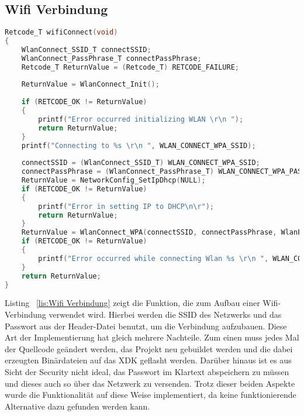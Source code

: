 \subsection{Wifi Verbindung}\label{subsec:Wifi Verbindung}
\begin{lstlisting}[language=C, caption={Wifi Verbindung}, label=lis:Wifi Verbindung]
Retcode_T wifiConnect(void)
{
	WlanConnect_SSID_T connectSSID;
	WlanConnect_PassPhrase_T connectPassPhrase;
	Retcode_T ReturnValue = (Retcode_T) RETCODE_FAILURE;
	
	ReturnValue = WlanConnect_Init();
	
	if (RETCODE_OK != ReturnValue)
	{
		printf("Error occurred initializing WLAN \r\n ");
		return ReturnValue;
	}
	printf("Connecting to %s \r\n ", WLAN_CONNECT_WPA_SSID);
	
	connectSSID = (WlanConnect_SSID_T) WLAN_CONNECT_WPA_SSID;
	connectPassPhrase = (WlanConnect_PassPhrase_T) WLAN_CONNECT_WPA_PASS;
	ReturnValue = NetworkConfig_SetIpDhcp(NULL);
	if (RETCODE_OK != ReturnValue)
	{
		printf("Error in setting IP to DHCP\n\r");
		return ReturnValue;
	}
	ReturnValue = WlanConnect_WPA(connectSSID, connectPassPhrase, WlanEventCallback);
	if (RETCODE_OK != ReturnValue)
	{
		printf("Error occurred while connecting Wlan %s \r\n ", WLAN_CONNECT_WPA_SSID);
	}
	return ReturnValue;
}
\end{lstlisting}
Listing ~\ref{lis:Wifi Verbindung} zeigt die Funktion, die zum Aufbau einer Wifi-Verbindung verwendet wird. Hierbei werden die \acf{SSID} des Netzwerks und das Passwort aus der Header-Datei benutzt, um die Verbindung aufzubauen. Diese Art der Implementierung hat gleich mehrere Nachteile. Zum einen muss jedes Mal der Quellcode geändert werden, das Projekt neu gebuildet werden und die dabei erzeugten Binärdateien auf das \acs{XDK} geflasht werden. Darüber hinaus ist es aus Sicht der Security nicht ideal, das Passwort im Klartext abspeichern zu müssen und dieses auch so über das Netzwerk zu versenden.\newline
Trotz dieser beiden Aspekte wurde die Funktionalität auf diese Weise implementiert, da keine funktionierende Alternative dazu gefunden werden kann.
